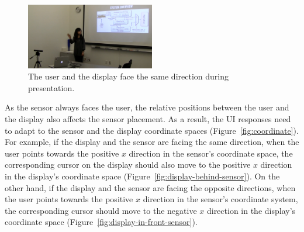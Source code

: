 \begin{figure}[tbh]
\centering
\includegraphics[width=0.5\textwidth]{figures/circle1.png}
\caption{The user and the display face the same direction during presentation.}
\label{fig:presentation}
\end{figure}

As the sensor always faces the user, the relative positions between the user
and the display also affects the sensor placement. As a result, the UI responses
need to adapt to the sensor and the display coordinate spaces
(Figure~\ref{fig:coordinate}).
For example, if the display and the sensor are facing the same direction, when the user points towards the positive $x$ direction in the
sensor's coordinate space, the corresponding cursor on the display should also
move to the positive $x$ direction in the display's coordinate space 
(Figure~\ref{fig:display-behind-sensor}).
On the other hand, if the display and the sensor are facing the opposite
directions, when the user points towards the positive $x$ direction in the
sensor's coordinate system, the corresponding cursor should move to the negative
$x$ direction in the display's coordinate space
(Figure~\ref{fig:display-in-front-sensor}).

